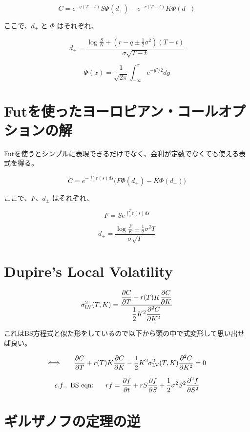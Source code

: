 \documentclass[uplatex]{jsarticle}
\begin{document}
\[
	C = e^{-q(T-t)} S \Phi(d_{+}) - e^{-r(T-t)} K \Phi(d_{-})
\]

ここで、$d_{\pm}$ と $\Phi$ はそれぞれ、

\[
	d_{\pm} = \frac{ \displaystyle \log \frac{S}{K} + (r-q \pm \frac{1}{2} \sigma^{2} ) (T-t) }{ \sigma \sqrt{ T - t } }
\]

\[
	\Phi(x) = \frac{1}{ \sqrt{2 \pi} } \int^{x}_{- \infty} e^{-y^{2}/2} dy
\]


\section{Futを使ったヨーロピアン・コールオプションの解}

Futを使うとシンプルに表現できるだけでなく、金利が定数でなくても使える表式を得る。

\[
	C = e^{-\int^{T}_{0} r(s) ds} \Big( F \Phi(d_{+}) - K \Phi(d_{-}) \Big)
\]

ここで、$F$、$d_{\pm}$ はそれぞれ、

\[
	F = S e^{\int^{T}_{0} r(s) ds }
\]

\[
	d_{\pm} = \frac{ \displaystyle \log \frac{F}{K} \pm \frac{1}{2} \sigma^{2} T }{ \sigma \sqrt{ T } }
\]

\section{Dupire's Local Volatility}

\[
	\sigma_{\rm LV}^{2}(T,K)
	=
	\frac{
		\displaystyle
		\frac{\partial C}{\partial T} + r(T) K \frac{\partial C}{\partial K}
	}{
		\displaystyle
		\frac{1}{2} K^{2}
		\frac{\partial^{2} C}{\partial K^{2}}
	}
\]

これはBS方程式と似た形をしているので以下から頭の中で式変形して思い出せば良い。

\[
	\Longleftrightarrow
	\ \hspace{5mm}
	\frac{\partial C}{\partial T} + r(T) K \frac{\partial C}{\partial K}
	-
	\frac{1}{2} K^{2}
	\sigma_{\rm LV}^{2}(T,K)
	\frac{\partial^{2} C}{\partial K^{2}}
	=0
\]

\[
	c.f., \
	\text{BS eqn:}
	\ \hspace{5mm}
	rf
	=
	\frac{\partial f}{\partial t}
	+
	r S \frac{\partial f}{\partial S}
	+
	\frac{1}{2} \sigma^{2} S^{2}
	\frac{\partial^{2} f}{\partial S^{2}}
\]



\section{ギルザノフの定理の逆}
\end{document}
